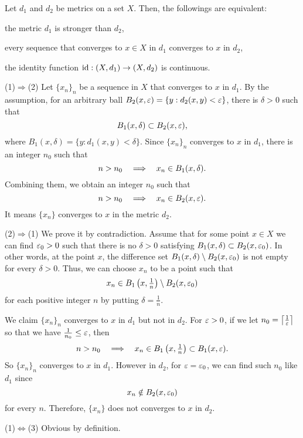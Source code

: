 \begin{prop}\label{prop:metric refinements are variously described}
Let $d_1$ and $d_2$ be metrics on a set $X$.
Then, the followings are equivalent:
\begin{cond}
\item the metric $d_1$ is stronger than $d_2$,
\item every sequence that converges to $x\in X$ in $d_1$ converges to $x$ in $d_2$,
\item the identity function $\id:(X,d_1)\to(X,d_2)$ is continuous.
\end{cond}
\end{prop}
\begin{pf}
(1)$\Rightarrow$(2)
Let $\{x_n\}_n$ be a sequence in $X$ that converges to $x$ in $d_1$.
By the assumption, for an arbitrary ball $B_2(x,\varepsilon)=\{y:d_2(x,y)<\varepsilon\}$, there is $\delta>0$ such that
\[B_1(x,\delta)\subset B_2(x,\varepsilon),\]
where $B_1(x,\delta)=\{y:d_1(x,y)<\delta\}$.
Since $\{x_n\}_n$ converges to $x$ in $d_1$, there is an integer $n_0$ such that
\[n>n_0\impl x_n\in B_1(x,\delta).\]
Combining them, we obtain an integer $n_0$ such that
\[n>n_0\impl x_n\in B_2(x,\e).\]
It means $\{x_n\}$ converges to $x$ in the metric $d_2$.

(2)$\Rightarrow$(1)
We prove it by contradiction.
Assume that for some point $x\in X$ we can find $\varepsilon_0>0$ such that there is no $\delta>0$ satisfying $B_1(x,\delta)\subset B_2(x,\varepsilon_0)$.
In other words, at the point $x$, the difference set $B_1(x,\delta)\setminus B_2(x,\varepsilon_0)$ is not empty for every $\delta>0$.
Thus, we can choose $x_n$ to be a point such that
\[x_n\in B_1\left(x,\tfrac1n\right)\setminus B_2(x,\varepsilon_0)\]
for each positive integer $n$ by putting $\delta=\frac1n$.

We claim $\{x_n\}_n$ converges to $x$ in $d_1$ but not in $d_2$.
For $\varepsilon>0$, if we let $n_0=\left\lceil\frac1{\varepsilon}\right\rceil$ so that we have $\frac1{n_0}\le\varepsilon$, then
\[n>n_0\impl x_n\in B_1\left(x,\tfrac1n\right)\subset B_1(x,\e).\]
So $\{x_n\}_n$ converges to $x$ in $d_1$.
However in $d_2$, for $\varepsilon=\varepsilon_0$, we can find such $n_0$ like $d_1$ since
\[x_n\notin B_2(x,\varepsilon_0)\]
for every $n$.
Therefore, $\{x_n\}$ does not converges to $x$ in $d_2$.

(1)$\Leftrightarrow$(3)
Obvious by definition.
\end{pf}

